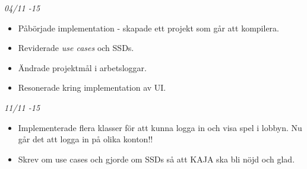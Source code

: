 \documentclass{article}
\begin{document}
    {\large \textit{04/11 -15}}
    \begin{itemize}
        \item Påbörjade implementation - skapade ett projekt som går att
              kompilera.
        \item Reviderade \textit{use cases} och SSDs.
        \item Ändrade projektmål i arbetsloggar.
        \item Resonerade kring implementation av UI.
    \end{itemize}

    {\large \textit{11/11 -15}}
    \begin{itemize}
        \item Implementerade flera klasser för att kunna logga in och visa spel
              i lobbyn. Nu går det att logga in på olika konton!!
        \item Skrev om use cases och gjorde om SSDs så att KAJA ska bli nöjd och
              glad.
    \end{itemize}
\end{document}
